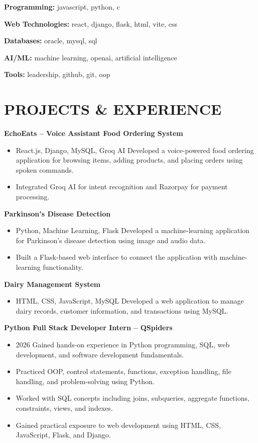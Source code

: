 \documentclass[9pt,a4paper]{extarticle}
\begin{document}
\textbf{Programming:} javascript, python, c

\textbf{Web Technologies:} react, django, flask, html, vite, css

\textbf{Databases:} oracle, mysql, sql

\textbf{AI/ML:} machine learning, openai, artificial intelligence

\textbf{Tools:} leadership, github, git, oop


\section*{PROJECTS \& EXPERIENCE}

\noindent \textbf{EchoEats – Voice Assistant Food Ordering System}
\begin{itemize}[leftmargin=*, parsep=0pt, itemsep=1pt, topsep=1pt]
    \item React.js, Django, MySQL, Groq AI Developed a voice-powered food ordering application for browsing items, adding products, and placing orders using spoken commands.
    \item Integrated Groq AI for intent recognition and Razorpay for payment processing.
\end{itemize}
\vspace{2pt}
\noindent \textbf{Parkinson’s Disease Detection}
\begin{itemize}[leftmargin=*, parsep=0pt, itemsep=1pt, topsep=1pt]
    \item Python, Machine Learning, Flask Developed a machine-learning application for Parkinson’s disease detection using image and audio data.
    \item Built a Flask-based web interface to connect the application with machine-learning functionality.
\end{itemize}
\vspace{2pt}
\noindent \textbf{Dairy Management System}
\begin{itemize}[leftmargin=*, parsep=0pt, itemsep=1pt, topsep=1pt]
    \item HTML, CSS, JavaScript, MySQL Developed a web application to manage dairy records, customer information, and transactions using MySQL.
\end{itemize}
\vspace{2pt}
\noindent \textbf{Python Full Stack Developer Intern – QSpiders}
\begin{itemize}[leftmargin=*, parsep=0pt, itemsep=1pt, topsep=1pt]
    \item 2026 Gained hands-on experience in Python programming, SQL, web development, and software development fundamentals.
    \item Practiced OOP, control statements, functions, exception handling, file handling, and problem-solving using Python.
    \item Worked with SQL concepts including joins, subqueries, aggregate functions, constraints, views, and indexes.
    \item Gained practical exposure to web development using HTML, CSS, JavaScript, Flask, and Django.
\end{itemize}
\end{document}
